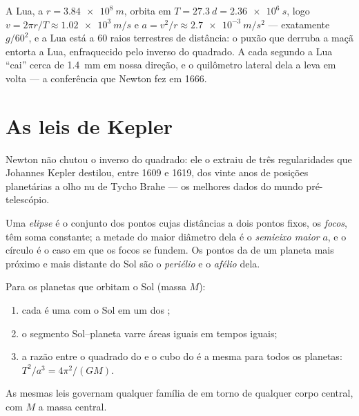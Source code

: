 \begin{example}\label{ex:g12:satellites-kepler:moon}
A Lua, a $r = \qty{3.84e8}{m}$, orbita em $T = \qty{27.3}{d} = \qty{2.36e6}{s}$, logo
$v = 2\pi r/T \approx \qty{1.02e3}{m/s}$ e $a = v^2/r \approx \qty{2.7e-3}{m/s^2}$ ---
exatamente $g/60^2$, e a Lua está a $60$ raios terrestres de distância: o puxão que
derruba a maçã entorta a Lua, enfraquecido pelo inverso do quadrado. A cada segundo a
Lua ``cai'' cerca de \qty{1.4}{mm} em nossa direção, e o quilômetro lateral dela a
leva em volta --- a conferência que Newton fez em 1666.
\end{example}

\section{As leis de Kepler}

Newton não chutou o inverso do quadrado: ele o extraiu de três regularidades que
Johannes Kepler destilou, entre 1609 e 1619, dos vinte anos de posições planetárias a
olho nu de Tycho Brahe --- os melhores dados do mundo pré-telescópio.

\begin{definition}[Elipse]\label{def:g12:satellites-kepler:ellipse}
Uma \emph{elipse} é o conjunto dos pontos cujas distâncias a dois pontos
fixos, os \emph{focos}, têm soma constante; a metade do
maior diâmetro dela é o \emph{semieixo maior} $a$, e o círculo é
o caso em que os focos se fundem. Os pontos da  de um planeta mais próximo e
mais distante do Sol são o \emph{periélio} e o
\emph{afélio} dela.
\end{definition}

\begin{theorem}\label{thm:g12:satellites-kepler:kepler}
%
Para os planetas que orbitam o Sol (massa $M$):
\begin{enumerate}
  \item cada  é uma  com o Sol em um dos ;
  \item o segmento Sol--planeta varre áreas iguais em tempos iguais;
  \item a razão entre o quadrado do  e o cubo do  é a mesma para
        todos os planetas: $T^2/a^3 = 4\pi^2/(G M)$.
\end{enumerate}
As mesmas leis governam qualquer família de  em torno de qualquer corpo
central, com $M$ a massa central. \admitted
\end{theorem}

